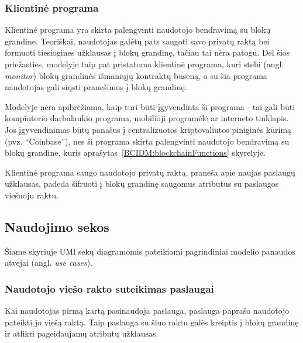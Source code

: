 \subsubsection{Klientinė programa}

Klientinė programa yra skirta palengvinti naudotojo bendravimą su blokų grandine. Teoriškai, naudotojas galėtų pats saugoti
savo privatų raktą bei formuoti tiesiogines užklausas į blokų grandinę, tačiau tai nėra patogu. Dėl šios priežasties,
modelyje taip pat pristatoma klientinė programa, kuri stebi (angl. \textit{monitor}) blokų grandinės išmaniųjų kontraktų būseną,
o su šia programa naudotojas gali siųsti pranešimus į blokų grandinę.

Modelyje nėra apibrėžiama, kaip turi būti įgyvendinta ši programa - tai gali būti kompiuterio darbalaukio programa,
mobilioji programėlė ar 
interneto tinklapis. Jos įgyvendinimas būtų panašus į centralizuotos kriptovaliutos piniginės kūrimą (pvz. \enquote{Coinbase}), nes ši
programa skirta palengvinti naudotojo bendravimą su blokų grandine, kuris aprašytas~\ref{BCIDM:blockchainFunctions} skyrelyje.

Klientinė programa saugo naudotojo privatų raktą, praneša apie naujas paslaugų užklausas, padeda šifruoti
į blokų grandinę saugomus atributus su paslaugos viešuoju raktu.

\subsection{Naudojimo sekos}

Šiame skyriuje UMl sekų diagramomis pateikiami pagrindiniai modelio panaudos atvejai (angl. \textit{use cases}).

\subsubsection{Naudotojo viešo rakto suteikimas paslaugai}

Kai naudotojas pirmą kartą pasinaudoja paslauga, paslauga paprašo naudotojo pateikti jo viešą raktą. Taip paslauga
su šiuo raktu galės kreiptis į blokų grandinę ir atlikti pageidaujamų atributų užklausas.

